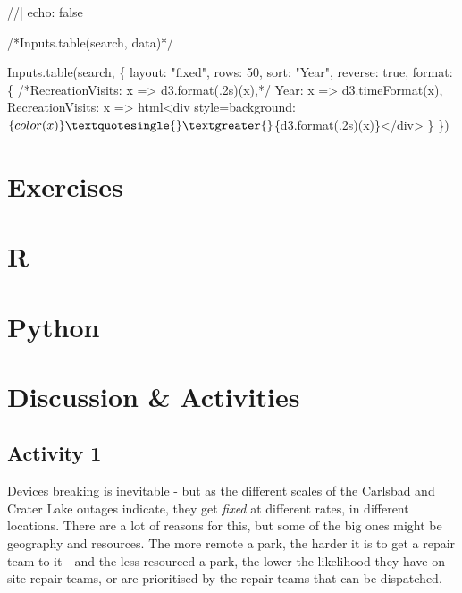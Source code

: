 \documentclass[
  letterpaper,
  DIV=11,
  numbers=noendperiod]{scrartcl}
\newenvironment{Shaded}{\begin{snugshade}}{\end{snugshade}}
\newcommand{\NormalTok}[1]{\textcolor[rgb]{0.00,0.23,0.31}{#1}}
\begin{document}
\begin{Shaded}
\begin{Highlighting}[]
\NormalTok{//| echo: false}

\NormalTok{/*Inputs.table(search, data)*/}

\NormalTok{Inputs.table(search, \{}
\NormalTok{  layout: "fixed",}
\NormalTok{  rows: 50,}
\NormalTok{  sort: "Year",}
\NormalTok{  reverse: true,}
\NormalTok{  format: \{}
\NormalTok{    /*RecreationVisits: x =\textgreater{} d3.format(\textquotesingle{}.2s\textquotesingle{})(x),*/}
\NormalTok{    Year: x =\textgreater{} d3.timeFormat(x),}
\NormalTok{    RecreationVisits: x =\textgreater{} html\textasciigrave{}\textless{}div style=\textquotesingle{}background:$\{color(x)\}\textquotesingle{}\textgreater{}$\{d3.format(\textquotesingle{}.2s\textquotesingle{})(x)\}\textless{}/div\textgreater{}\textasciigrave{}}
\NormalTok{  \}}
\NormalTok{\})}
\end{Highlighting}
\end{Shaded}

\section{Exercises}

\section{R}

\label{exercise-posts}

\section{Python}

\section{Discussion \& Activities}

\subsection{Activity 1}\label{exercise-1}

Devices breaking is inevitable - but as the different scales of the
Carlsbad and Crater Lake outages indicate, they get \emph{fixed} at
different rates, in different locations. There are a lot of reasons for
this, but some of the big ones might be geography and resources. The
more remote a park, the harder it is to get a repair team to it---and
the less-resourced a park, the lower the likelihood they have on-site
repair teams, or are prioritised by the repair teams that can be
dispatched.
\end{document}
